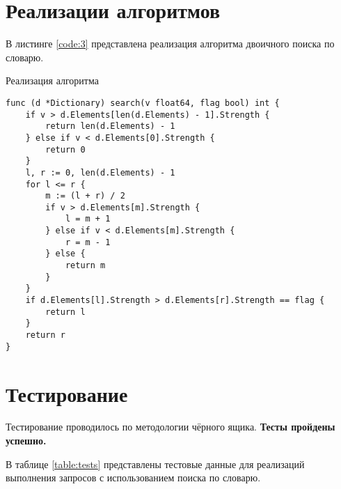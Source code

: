 \section{Реализации алгоритмов}
В листинге \ref{code:3} представлена реализация алгоритма двоичного поиска по словарю.

\begin{code}
\caption{Реализация алгоритма}
\label{code:3}
\begin{verbatim}
func (d *Dictionary) search(v float64, flag bool) int {
	if v > d.Elements[len(d.Elements) - 1].Strength {
		return len(d.Elements) - 1
	} else if v < d.Elements[0].Strength {
		return 0
	}
	l, r := 0, len(d.Elements) - 1
	for l <= r {
		m := (l + r) / 2
		if v > d.Elements[m].Strength {
			l = m + 1
		} else if v < d.Elements[m].Strength {
			r = m - 1
		} else {
			return m
		}
	}
	if d.Elements[l].Strength > d.Elements[r].Strength == flag {
		return l
	}
	return r
}
\end{verbatim}
\end{code}

\newpage

\section{Тестирование}
Тестирование проводилось по методологии чёрного ящика. \textbf{Тесты пройдены успешно.}

В таблице \ref{table:tests} представлены тестовые данные для реализаций выполнения запросов с использованием поиска по словарю. 

